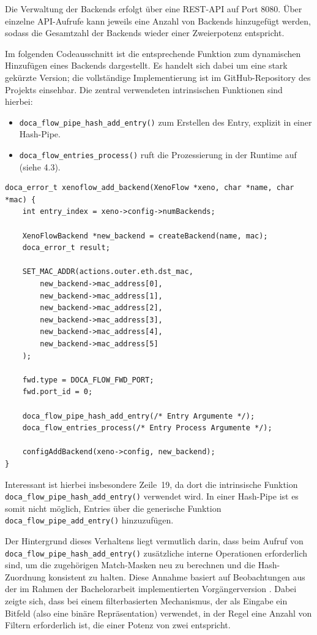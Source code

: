 \documentclass[paper=a4, fontsize=11pt]{scrartcl} %
\numberwithin{equation}{section} %
\numberwithin{figure}{section} %
\numberwithin{table}{section} %
\begin{document}
Die Verwaltung der Backends erfolgt über eine REST-API auf Port 8080. Über einzelne API-Aufrufe kann jeweils eine Anzahl von Backends hinzugefügt werden, sodass die Gesamtzahl der Backends wieder einer Zweierpotenz entspricht.

Im folgenden Codeausschnitt ist die entsprechende Funktion zum dynamischen Hinzufügen eines Backends dargestellt. Es handelt sich dabei um eine stark gekürzte Version; die vollständige Implementierung ist im GitHub-Repository des Projekts einsehbar. Die zentral verwendeten intrinsischen Funktionen sind hierbei:
\begin{itemize}
    \item \texttt{doca\_flow\_pipe\_hash\_add\_entry()} zum Erstellen des Entry, explizit in einer Hash-Pipe.
    \item \texttt{doca\_flow\_entries\_process()} ruft die Prozessierung in der Runtime auf (siehe 4.3).
\end{itemize}
\begin{verbatim}
doca_error_t xenoflow_add_backend(XenoFlow *xeno, char *name, char *mac) {
    int entry_index = xeno->config->numBackends;
    
    XenoFlowBackend *new_backend = createBackend(name, mac);
    doca_error_t result;
    
    SET_MAC_ADDR(actions.outer.eth.dst_mac,
        new_backend->mac_address[0], 
        new_backend->mac_address[1], 
        new_backend->mac_address[2],
        new_backend->mac_address[3], 
        new_backend->mac_address[4], 
        new_backend->mac_address[5]
    );
    
    fwd.type = DOCA_FLOW_FWD_PORT;
    fwd.port_id = 0;
    
    doca_flow_pipe_hash_add_entry(/* Entry Argumente */);
    doca_flow_entries_process(/* Entry Process Argumente */);
    
    configAddBackend(xeno->config, new_backend);
}
\end{verbatim}
Interessant ist hierbei insbesondere Zeile~19, da dort die intrinsische Funktion \texttt{doca\_flow\_pipe\_hash\_add\_entry()} verwendet wird. In einer Hash-Pipe ist es somit nicht möglich, Entries über die generische Funktion \texttt{doca\_flow\_pipe\_add\_entry()} hinzuzufügen.

Der Hintergrund dieses Verhaltens liegt vermutlich darin, dass beim Aufruf von \texttt{doca\_flow\_pipe\_hash\_add\_entry()} zusätzliche interne Operationen erforderlich sind, um die zugehörigen Match-Masken neu zu berechnen und die Hash-Zuordnung konsistent zu halten. Diese Annahme basiert auf Beobachtungen aus der im Rahmen der Bachelorarbeit implementierten Vorgängerversion \cite{heimbrodt2025bluefield}. Dabei zeigte sich, dass bei einem filterbasierten Mechanismus, der als Eingabe ein Bitfeld (also eine binäre Repräsentation) verwendet, in der Regel eine Anzahl von Filtern erforderlich ist, die einer Potenz von zwei entspricht.
\end{document}
